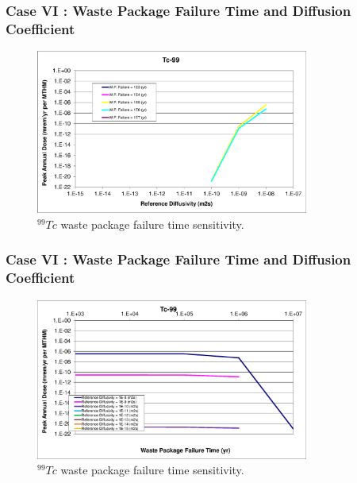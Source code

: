 \begin{frame}[c]
  \frametitle{Case VI : Waste Package Failure Time and Diffusion Coefficient}
\begin{figure}[ht!]
\centering
\includegraphics[width=0.8\textwidth]{WPFailExtended/Tc-99.eps}
\caption{$^{99}Tc$ waste package failure time sensitivity. }
\label{fig:WPFailTc99}
\end{figure}
\end{frame}

\begin{frame}[c]
  \frametitle{Case VI : Waste Package Failure Time and Diffusion Coefficient}

\begin{figure}[ht!]
\centering
\includegraphics[width=0.8\textwidth]{WPFailExtended/Tc-99-WPFail.eps}
\caption{$^{99}Tc$ waste package failure time sensitivity. }
\label{fig:WPFailTc99}
\end{figure}
\end{frame}

